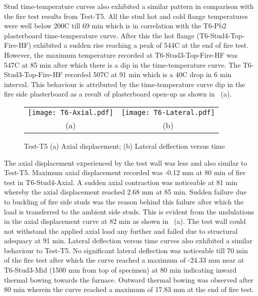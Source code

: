 Stud time-temperature curves also exhibited a similar pattern in comparison with the fire test results from Test-T5. All the stud hot and cold flange temperatures were well below 200\degree C till 69 min which is in correlation with the T6-Pb2 plasterboard time-temperature curve. After this the hot flange (T6-Stud4-Top-Fire-HF) exhibited a sudden rise reaching a peak of 544\degree C at the end of fire test. However, the maximum temperature recorded at T6-Stud3-Top-Fire-HF was 547\degree C at 85 min after which there is a dip in the time-temperature curve. The T6-Stud3-Top-Fire-HF recorded 507\degree C at 91 min which is a 40\degree C drop in 6 min interval. This behaviour is attributed by the time-temperature curve dip in the fire side plasterboard as a result of plasterboard open-up as shown in ~(a). 
\begin{figure}[!htbp]
	\centering	
		\begin{tabular}{cc}
			\texttt{[image: T6-Axial.pdf]} & \texttt{[image: T6-Lateral.pdf]} \\
			(a) & (b) \\
			\end{tabular}
		\caption{Test-T5 (a) Axial displacement; (b) Lateral deflection versus time}
		\label{fig:T6-displacement}
\end{figure}

The axial displacement experienced by the test wall was less and also similar to Test-T5. Maximum axial displacement recorded was -0.12 mm at 80 min of fire test in T6-Stud4-Axial. A sudden axial contraction was noticeable at 81 min whereby the axial displacement reached 2.68 mm at 85 min. Sudden failure due to buckling of fire side studs was the reason behind this failure after which the load is transferred to the ambient side studs. This is evident from the undulations in the axial displacement curve at 82 min as shown in ~(a). The test wall could not withstand the applied axial load any further and failed due to structural adequacy at 91 min. Lateral deflection versus time curves also exhibited a similar behaviour to Test-T5. No significant lateral deflection was noticeable till 70 min of the fire test after which the curve reached a maximum of -24.33 mm near at T6-Stud3-Mid (1500 mm from top of specimen) at 80 min indicating inward thermal bowing towards the furnace. Outward thermal bowing was observed after 80 min wherein the curve reached a maximum of 17.83 mm at the end of fire test.

